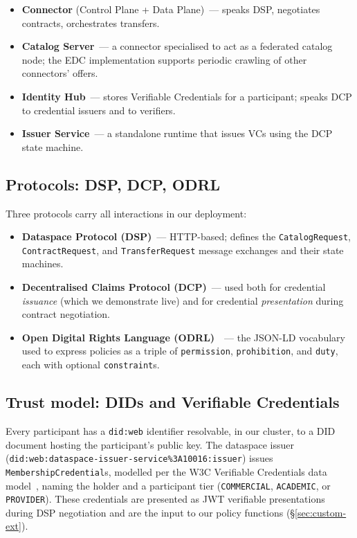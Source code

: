 \documentclass[11pt,a4paper]{article}
\DeclareRobustCommand{\code}[1]{\texttt{\small #1}}
\begin{document}
\begin{itemize}
  \item \textbf{Connector} (Control Plane + Data Plane)~--- speaks DSP,
    negotiates contracts, orchestrates transfers.
  \item \textbf{Catalog Server}~--- a connector specialised to act as a
    federated catalog node; the EDC implementation supports periodic
    crawling of other connectors' offers.
  \item \textbf{Identity Hub}~--- stores Verifiable Credentials for a
    participant; speaks DCP to credential issuers and to verifiers.
  \item \textbf{Issuer Service}~--- a standalone runtime that issues VCs
    using the DCP state machine.
\end{itemize}

\subsection{Protocols: DSP, DCP, ODRL}

Three protocols carry all interactions in our deployment:

\begin{itemize}
  \item \textbf{Dataspace Protocol (DSP)}~--- HTTP-based; defines the
    \code{CatalogRequest}, \code{ContractRequest}, and \code{TransferRequest}
    message exchanges and their state machines.
  \item \textbf{Decentralised Claims Protocol (DCP)}~--- used both for
    credential \emph{issuance} (which we demonstrate live) and for credential
    \emph{presentation} during contract negotiation.
  \item \textbf{Open Digital Rights Language (ODRL)}~\cite{w3c-odrl}~--- the
    JSON-LD vocabulary used to express policies as a triple of
    \code{permission}, \code{prohibition}, and \code{duty}, each with
    optional \code{constraint}s.
\end{itemize}

\subsection{Trust model: DIDs and Verifiable Credentials}
\label{sec:trust}

Every participant has a \code{did:web} identifier resolvable, in our cluster,
to a DID document hosting the participant's public key. The dataspace issuer
(\code{did:web:dataspace-issuer-service\%3A10016:issuer}) issues
\code{MembershipCredential}s, modelled per the W3C Verifiable Credentials
data model~\cite{w3c-vc}, naming the holder and a participant tier
(\code{COMMERCIAL}, \code{ACADEMIC}, or \code{PROVIDER}). These credentials
are presented as JWT verifiable presentations during DSP negotiation and are
the input to our policy functions (§\ref{sec:custom-ext}).
\end{document}
